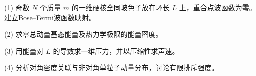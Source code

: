 (1) 奇数 \(N\) 个质量 \(m\) 的一维硬核全同玻色子放在环长 \(L\) 上，重合点波函数为零。建立Bose–Fermi波函数映射。

(2) 求零总动量基态能量及热力学极限的能量密度。

(3) 用能量对 \(L\) 的导数求一维压力，并以压缩性求声速。

(4) 分析对角密度关联与非对角单粒子动量分布，讨论有限排斥强度。
